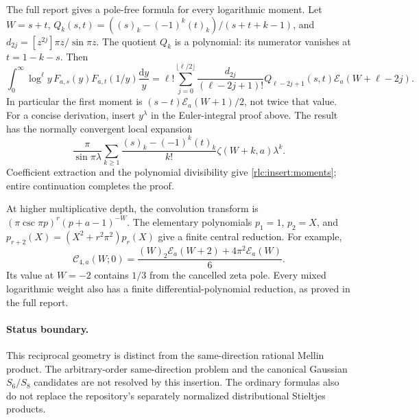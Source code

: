 The full report gives a pole-free formula for every logarithmic moment.
Let $W=s+t$,
$Q_k(s,t)=((s)_k-(-1)^k(t)_k)/(s+t+k-1)$,
and $d_{2j}=[z^{2j}]\pi z/\sin\pi z$. The quotient $Q_k$ is a
polynomial: its numerator vanishes at $t=1-k-s$. Then
\begin{equation}\label{rlc:insert:moments}
 \int_0^\infty\log^\ell y\,F_{a,s}(y)F_{a,t}(1/y)\frac{\mathrm dy}{y}
 =\ell!\sum_{j=0}^{\lfloor\ell/2\rfloor}
 \frac{d_{2j}}{(\ell-2j+1)!}
 Q_{\ell-2j+1}(s,t)\mathcal E_a(W+\ell-2j).
\end{equation}
In particular the first moment is
$(s-t)\mathcal E_a(W+1)/2$, not twice that value.
For a concise derivation, insert $y^\lambda$ in the Euler-integral
proof above. The result has the normally convergent local expansion
\[
 \frac{\pi}{\sin\pi\lambda}
 \sum_{k\ge1}\frac{(s)_k-(-1)^k(t)_k}{k!}
                \zeta(W+k,a)\lambda^k.
\]
Coefficient extraction and the polynomial divisibility give
\eqref{rlc:insert:moments}; entire continuation completes the proof.

At higher multiplicative depth, the convolution transform is
$(\pi\csc\pi p)^r(p+a-1)^{-W}$. The elementary polynomials
$p_1=1$, $p_2=X$, and
$p_{r+2}(X)=(X^2+r^2\pi^2)p_r(X)$ give a finite central reduction.
For example,
\[
 \mathcal C_{4,a}(W;0)=\frac{(W)_2\mathcal E_a(W+2)
                      +4\pi^2\mathcal E_a(W)}6.
\]
Its value at $W=-2$ contains $1/3$ from the cancelled zeta pole.
Every mixed logarithmic weight also has a finite differential-polynomial
reduction, as proved in the full report.

\paragraph{Status boundary.}
This reciprocal geometry is distinct from the same-direction rational
Mellin product. The arbitrary-order same-direction problem and the
canonical Gaussian $S_6/S_8$ candidates are not resolved by this insertion.
The ordinary formulas also do not replace the repository's separately
normalized distributional Stieltjes products.
